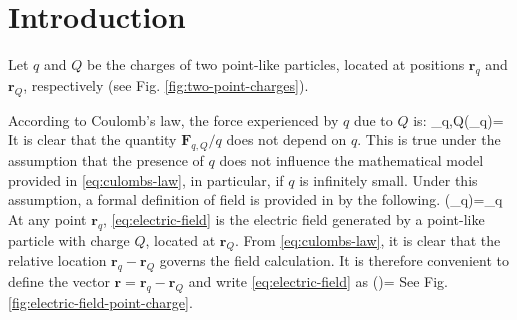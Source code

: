 \section{Introduction}
Let $q$ and $Q$ be the charges of two point-like particles, located at positions $\mathbf{r}_{q}$ and $\mathbf{r}_{Q}$, respectively
(see Fig. \ref{fig:two-point-charges}).

According to Coulomb's law, the force experienced by $q$ due to $Q$ is:
\be\label{eq:culombs-law}
_{q,Q}(_q)=
\ee
It is clear that the quantity $\mathbf{F}_{q,Q}/q$ does not depend on $q$. This is true under the assumption that the presence of $q$ does not influence the mathematical model provided in \ref{eq:culombs-law}, in particular, if $q$ is infinitely small. Under this assumption, a formal definition of field is provided in by the following.
\be\label{eq:electric-field}
(_{q})=\lim_{q } 
\ee
At any point $\mathbf{r}_{q}$, \ref{eq:electric-field} is the electric field generated by a point-like particle with charge $Q$, located at $\mathbf{r}_{Q}$. From \ref{eq:culombs-law}, it is clear that the relative location $\mathbf{r}_{q}-\mathbf{r}_{Q}$ governs the field calculation. It is therefore convenient to define the vector $\mathbf{r}=\mathbf{r}_{q}-\mathbf{r}_{Q}$ and write \ref{eq:electric-field} as 
\be\label{eq:electric-field-final}
()=
\ee
See Fig. \ref{fig:electric-field-point-charge}.
